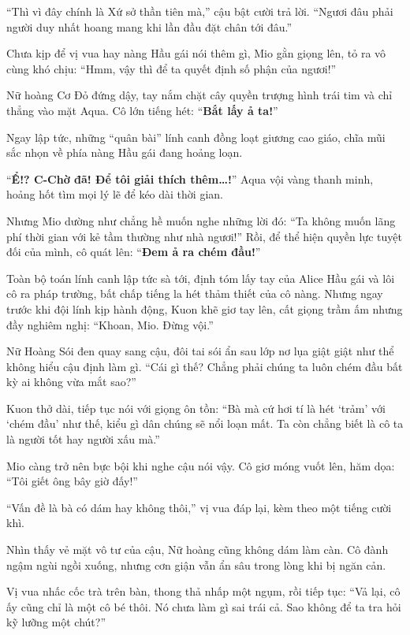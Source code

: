 \documentclass[../main.tex]{subfiles}
\begin{document}
``Thì vì đây chính là Xứ sở thần tiên mà,'' cậu bật cười trả lời. ``Ngươi đâu phải người duy nhất hoang mang khi lần đầu đặt chân tới đâu.''

Chưa kịp để vị vua hay nàng Hầu gái nói thêm gì, Mio gằn giọng lên, tỏ ra vô cùng khó chịu: ``Hmm, vậy thì để ta quyết định số phận của ngươi!''

Nữ hoàng Cơ Đỏ đứng dậy, tay nắm chặt cây quyền trượng hình trái tim và chỉ thẳng vào mặt Aqua. Cô lớn tiếng hét: ``\textbf{Bắt lấy ả ta!}''

Ngay lập tức, những ``quân bài'' lính canh đồng loạt giương cao giáo, chĩa mũi sắc nhọn về phía nàng Hầu gái đang hoảng loạn.

``\textbf{Ể!? C-Chờ đã! Để tôi giải thích thêm\dots!}'' Aqua vội vàng thanh minh, hoảng hốt tìm mọi lý lẽ để kéo dài thời gian.

Nhưng Mio dường như chẳng hề muốn nghe những lời đó: ``Ta không muốn lãng phí thời gian với kẻ tầm thường như nhà ngươi!'' Rồi, để thể hiện quyền lực tuyệt đối của mình, cô quát lên: ``\textbf{Đem ả ra chém đầu!}''

Toàn bộ toán lính canh lập tức sà tới, định tóm lấy tay của Alice Hầu gái và lôi cô ra pháp trường, bất chấp tiếng la hét thảm thiết của cô nàng. Nhưng ngay trước khi đội lính kịp hành động, Kuon khẽ giơ tay lên, cất giọng trầm ấm nhưng đầy nghiêm nghị: ``Khoan, Mio. Đừng vội.''

Nữ Hoàng Sói đen quay sang cậu, đôi tai sói ẩn sau lớp nơ lụa giật giật như thể không hiểu cậu định làm gì. ``Cái gì thế? Chẳng phải chúng ta luôn chém đầu bất kỳ ai không vừa mắt sao?''

Kuon thở dài, tiếp tục nói với giọng ôn tồn: ``Bà mà cứ hơi tí là hét `trảm' với `chém đầu' như thế, kiểu gì dân chúng sẽ nổi loạn mất. Ta còn chẳng biết là cô ta là người tốt hay người xấu mà.''

Mio càng trở nên bực bội khi nghe cậu nói vậy. Cô giơ móng vuốt lên, hăm dọa: ``Tôi giết ông bây giờ đấy!''

``Vấn đề là bà có dám hay không thôi,'' vị vua đáp lại, kèm theo một tiếng cười khì.

Nhìn thấy vẻ mặt vô tư của cậu, Nữ hoàng cũng không dám làm càn. Cô đành ngậm ngùi ngồi xuống, nhưng cơn giận vẫn ẩn sâu trong lòng khi bị ngăn cản.

Vị vua nhấc cốc trà trên bàn, thong thả nhấp một ngụm, rồi tiếp tục: ``Vả lại, cô ấy cũng chỉ là một cô bé thôi. Nó chưa làm gì sai trái cả. Sao không để ta tra hỏi kỹ lưỡng một chút?''
\end{document}
